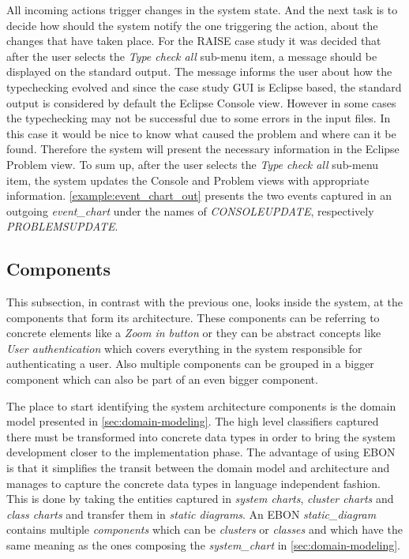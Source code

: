 \documentclass[conference]{IEEEtran}
\begin{document}
All incoming actions trigger changes in the system state. And the
next task is to decide how should the system notify the one triggering the
action, about the changes that have taken place. For the RAISE case
study it was decided that after the user selects the \emph{Type check
all} sub-menu item, a message should be displayed on the standard output.
The message informs the user about how the typechecking evolved and
since the case study GUI is Eclipse based, the standard output is considered by
default the Eclipse Console view. However in some cases the
typechecking may not be successful due to some errors in the input
files. In this case it would be nice to know what caused the problem
and where can it be found. Therefore the system will present the
necessary information in the Eclipse Problem view. To sum up, after the
user selects the \emph{Type check all} sub-menu item, the system updates the
Console and Problem views with appropriate information.
\autoref{example:event_chart_out} presents the two events captured in
an outgoing \emph{event\_chart} under the names of
\emph{CONSOLEUPDATE}, respectively \emph{PROBLEMSUPDATE}.


%
\subsection{Components}
\label{sec:components}

This subsection, in contrast with the previous one, looks inside the
system, at the components that form its architecture. These components
can be referring to concrete elements like a \emph{Zoom in button} or
they can be abstract concepts like \emph{User authentication} which
covers everything in the system responsible for authenticating a user.
Also multiple components can be grouped in a bigger component which
can also be part of an even bigger component.

The place to start identifying the system architecture components is
the domain model presented in \autoref{sec:domain-modeling}. The high
level classifiers captured there must be transformed into concrete
data types in order to bring the system development closer to the
implementation phase. The advantage of using EBON is that it
simplifies the transit between the domain model and architecture
and manages to capture the concrete data types in language
independent fashion. This is done by taking the entities captured in
\emph{system charts}, \emph{cluster charts} and \emph{class charts} and
transfer them in \emph{static diagrams}. An EBON \emph{static\_diagram}
contains multiple \emph{components} which can be \emph{clusters} or
\emph{classes} and which have the same meaning as the ones composing the
\emph{system\_chart} in \autoref{sec:domain-modeling}.
\end{document}

